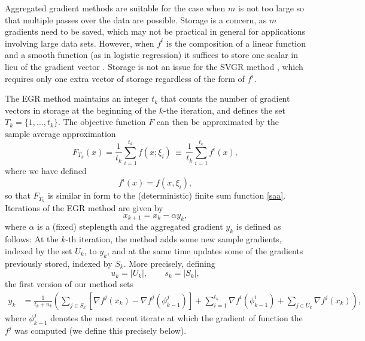 \documentclass[11pt]{article}
\begin{document}
Aggregated gradient methods are suitable for the case when $m$ is not too large so that multiple passes over the data are possible. Storage is a concern, as $m$ gradients need to be saved, which may not be practical in general for applications involving large data sets. However,  when $f^i$ is the composition of a linear function and a smooth function (as in logistic regression) it suffices to store one scalar in lieu of the gradient vector \cite{roux2012stochastic}. Storage is not an issue for the SVGR method \cite{johnson2013accelerating}, which requires only one extra vector of storage regardless of the form of $f^i$.

The EGR method maintains an integer $t_k $ that counts the number of gradient vectors in storage at the beginning of the $k$-the iteration, and defines the set $T_k = \{1, \ldots, t_k\}$. The objective function $F$ can then be approximated by the sample average approximation
\begin{equation}  \label{batch}
	F_{T_k}(x)= \frac{1}{t_k} \sum_{i =1}^{ t_k} f(x; \xi_i) \, \equiv \,  \frac{1}{t_k} \sum_{i =1}^{ t_k} f^i (x) ,
\end{equation}
where  we have defined
\begin{equation} \label{spring}
	f^i(x) =  f(x, \xi_i) ,
\end{equation}
so that $F_{T_k}$ is similar in form to the (deterministic) finite sum function \eqref{saa}.
Iterations of the EGR method are given by
\begin{equation}  \label{egri}
        x_{k+1}= x_k - \alpha y_k ,
\end{equation}
where $\alpha$ is a (fixed) steplength and the aggregated gradient $y_k$ is defined as follows: At the $k$-th iteration, the method adds some new sample gradients, indexed by the set $U_k$, to $y_k$, and at the same time updates some of the gradients previously stored, indexed by $S_k$. More precisely, defining
\begin{equation}   \label{usdef}
      u_k = | U_k |, \qquad s_k = | S_k |,
\end{equation}
the first version of our method sets
\begin{align}  \label{ysag}
      y_k & =  \frac{1}{t_{k}+u_k}  \left( \sum_{j \in S_k} \left[  \nabla f^j(x_{k}) -  \nabla f^j(\phi_{k-1}^j)\right]+ \sum_{i = 1}^{t_{k} }  \nabla f^i (\phi^i_{k-1})  + \sum_{j \in U_k} \nabla f^j(x_k) \right) ,
\end{align}
where  $\phi_{k-1}^j$ denotes the most recent iterate at which the gradient of function the $f^j$ was computed (we define this precisely below). 
\end{document}
